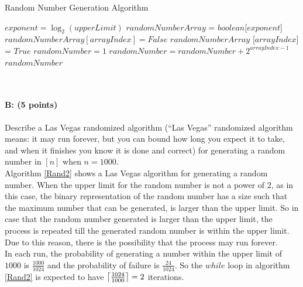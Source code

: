 \documentclass[11pt]{article}
\DeclarePairedDelimiter\ceil{\lceil}{\rceil}
\begin{document}
\begin{minipage}{\linewidth}
  \begin{algorithm}[H]
    \caption{Random Number Generation Algorithm}\label{Rand1}
    \begin{algorithmic}[1]
        \State $exponent = \log_2 (upperLimit)$
      	\State $randomNumberArray$ = $boolean$[$exponent$]
	    \State $randomNumberArray [arrayIndex] = False$
	  \Else 
	    \State $randomNumberArray$ [$arrayIndex$] = $True$
	  \EndIf
	\EndFor
	\State $randomNumber = 1$
	    \State $randomNumber = randomNumber + 2^{arrayIndex - 1}$
	  \EndIf
	\EndFor
	\Return $randomNumber$
      \EndProcedure
    \end{algorithmic}
  \end{algorithm}
\end{minipage}\\

\paragraph{B: (5 points)}
Describe a Las Vegas randomized algorithm (``Las Vegas'' randomized algorithm means: it may run forever, but you can bound how long you expect it to take, and when it finishes you know it is done and correct) for generating a random number in $[n]$ when $n=1000$.  \\

Algorithm \ref{Rand2} shows a Las Vegas algorithm for generating a random number. When the upper limit for the random number is not a power of $2$, as in this case, the binary representation of the random number has a size such that the maximum number that can be generated, is larger than the upper limit. So in case that the random number generated is larger than the upper limit, the process is repeated till the generated random number is within the upper limit. Due to this reason, there is the possibility that the process may run forever.\\

In each run, the probability of generating a number within the upper limit of $1000$ is $\frac{1000}{1024}$ and the probability of failure is $\frac{24}{1024}$. So the $while$ loop in algorithm \ref{Rand2} is expected to have $\ceil*{\frac{1024}{1000}} = 2$ iterations.
\end{document}
